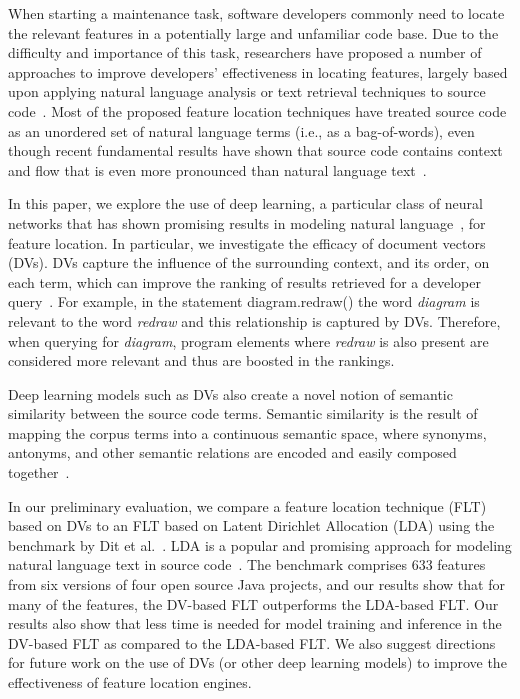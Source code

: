 
% 
%
When starting a maintenance task, software developers commonly need to
locate the relevant features in a potentially large and unfamiliar
code base. Due to the difficulty and importance of this task,
researchers have proposed a number of approaches to improve
developers' effectiveness in locating features, largely based upon
applying natural language analysis or text retrieval techniques to source
code~\cite{dit_feature_2013}. Most of the proposed feature location
techniques have treated source code as an unordered set of natural
language terms (i.e., as a bag-of-words), even though recent fundamental
results have shown that source code contains context and flow that is
even more pronounced than natural language
text~\cite{hindle_naturalness_2012}.


%
%
In this paper, we explore the use of deep learning, a particular class
of neural networks that has shown promising results in modeling
natural language~\cite{mikolov_distributed_2013}, for feature
location. In particular, we investigate the efficacy of document
vectors~\cite{le_distributed_2014} (DVs). DVs capture the influence of
the surrounding context, and its order, on each term, which can
improve the ranking of results retrieved for a developer
query~\cite{hill_use_2014}. For example, in the statement {\sf
diagram.redraw()} the word {\em diagram} is relevant to the word {\em
redraw} and this relationship is captured by DVs. Therefore, when
querying for {\em diagram}, program elements where {\em redraw} is
also present are considered more relevant and thus are boosted in the
rankings.

Deep learning models such as DVs also create a novel notion
of semantic similarity between the source code terms. Semantic
similarity is the result of mapping the corpus terms into a continuous
semantic space, where synonyms, antonyms, and other semantic relations
are encoded and easily composed together~\cite{le_distributed_2014}.


%
%

In our preliminary evaluation, we compare a feature location technique (FLT) based on DVs to an FLT based on Latent Dirichlet Allocation (LDA) using the benchmark by Dit et al.~\cite{Dit-etal_2013}. LDA is a popular and promising approach for modeling natural language text in source code~\cite{panichella_how_2013}.
The benchmark comprises 633 features from six versions of four open source Java projects, and our results show that for many of the features, the DV-based FLT outperforms the LDA-based FLT.
Our results also show that less time is needed for model training and inference in the DV-based FLT as compared to the LDA-based FLT.
We also suggest directions for future work on the use
of DVs (or other deep learning models) to improve the effectiveness of feature location engines.



